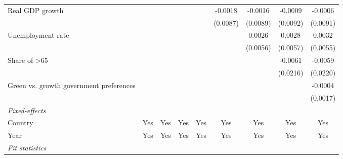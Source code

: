 \begin{table}[htbp]
\begin{tabular}{lcccccccc}
      Real GDP growth                                                  &                       &          &                &                & -0.0018        & -0.0016        & -0.0009         & -0.0006\\   
                                                                       &                       &          &                &                & (0.0087)       & (0.0089)       & (0.0092)        & (0.0091)\\   
      Unemployment rate                                                &                       &          &                &                &                & 0.0026         & 0.0028          & 0.0032\\   
                                                                       &                       &          &                &                &                & (0.0056)       & (0.0057)        & (0.0055)\\   
      Share of >65                                                     &                       &          &                &                &                &                & -0.0061         & -0.0059\\   
                                                                       &                       &          &                &                &                &                & (0.0216)        & (0.0220)\\   
      Green vs. growth government preferences                          &                       &          &                &                &                &                &                 & -0.0004\\   
                                                                       &                       &          &                &                &                &                &                 & (0.0017)\\   
      \midrule
      \emph{Fixed-effects}\\
      Country                                                          & Yes                   & Yes      & Yes            & Yes            & Yes            & Yes            & Yes             & Yes\\  
      Year                                                             & Yes                   & Yes      & Yes            & Yes            & Yes            & Yes            & Yes             & Yes\\  
      \midrule
      \emph{Fit statistics}\\

\end{tabular}
\end{table}
